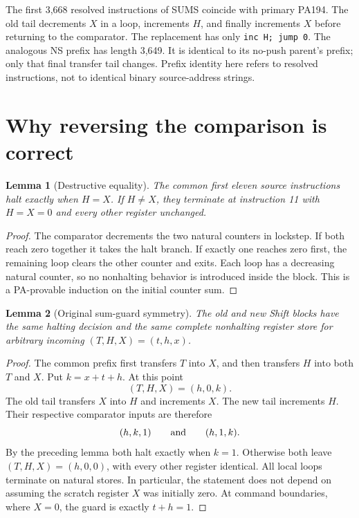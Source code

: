 \documentclass[11pt,a4paper]{article}
\newtheorem{lemma}{Lemma}
\begin{document}
The first 3,668 resolved instructions of SUMS coincide with primary PA194.
The old tail decrements $X$ in a loop, increments $H$, and finally
increments $X$ before returning to the comparator. The replacement has
only \texttt{inc H; jump 0}. The analogous NS prefix has length 3,649.
It is identical to its no-push parent's prefix; only that final transfer
tail changes. Prefix identity here refers to resolved instructions,
not to identical binary source-address strings.

\section{Why reversing the comparison is correct}
\begin{lemma}[Destructive equality]
The common first eleven source instructions halt exactly when $H=X$.
If $H\ne X$, they terminate at instruction 11 with $H=X=0$ and every
other register unchanged.
\end{lemma}
\begin{proof}
The comparator decrements the two natural counters in lockstep.
If both reach zero together it takes the halt branch. If exactly one
reaches zero first, the remaining loop clears the other counter and
exits. Each loop has a decreasing natural counter, so no nonhalting
behavior is introduced inside the block. This is a PA-provable
induction on the initial counter sum.
\end{proof}

\begin{lemma}[Original sum-guard symmetry]
The old and new Shift blocks have the same halting decision and the
same complete nonhalting register store for arbitrary incoming
$(T,H,X)=(t,h,x)$.
\end{lemma}
\begin{proof}
The common prefix first transfers $T$ into $X$, and then transfers
$H$ into both $T$ and $X$. Put $k=x+t+h$. At this point
\[
 (T,H,X)=(h,0,k).
\]
The old tail transfers $X$ into $H$ and increments $X$. The new tail
increments $H$. Their respective comparator inputs are therefore
\[
 (h,k,1)\qquad\hbox{and}\qquad(h,1,k).
\]
By the preceding lemma both halt exactly when $k=1$. Otherwise both
leave $(T,H,X)=(h,0,0)$, with every other register identical. All local
loops terminate on natural stores. In particular, the statement does
not depend on assuming the scratch register $X$ was initially zero.
At command boundaries, where $X=0$, the guard is exactly $t+h=1$.
\end{proof}
\end{document}
